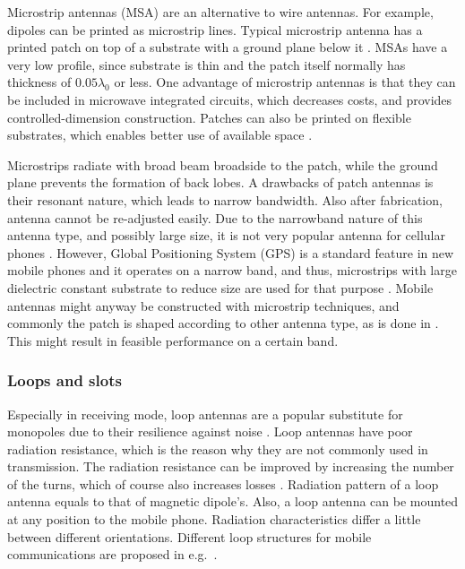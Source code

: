 Microstrip antennas (MSA) are an alternative to wire antennas. For example, dipoles can be printed as microstrip lines. Typical microstrip antenna has a printed patch on top of a substrate with a ground plane below it \cite{stutzman}. MSAs have a very low profile, since substrate is thin and the patch itself normally has thickness of $0.05\lambda_0$ or less. One advantage of microstrip antennas is that they can be included in microwave integrated circuits, which decreases costs, and provides controlled-dimension construction. Patches can also be printed on flexible substrates, which enables better use of available space \cite{stutzman}.

Microstrips radiate with broad beam broadside to the patch, while the ground plane prevents the formation of back lobes. A drawbacks of patch antennas is their resonant nature, which leads to narrow bandwidth. Also after fabrication, antenna cannot be re-adjusted easily. Due to the narrowband nature of this antenna type, and possibly large size, it is not very popular antenna for cellular phones \cite{stutzman}. However, Global Positioning System (GPS) is a standard feature in new mobile phones and it operates on a narrow band, and thus, microstrips with large dielectric constant substrate to reduce size are used for that purpose \cite{stutzman}. Mobile antennas might anyway be constructed with microstrip techniques, and commonly the patch is shaped according to other antenna type, as is done in \cite{microstrip_example1,microstrip_example2}. This might result in feasible performance on a certain band.

\subsubsection{Loops and slots}
\label{sec:loop}
Especially in receiving mode, loop antennas are a popular substitute for monopoles due to their resilience against noise \cite{balanis}. Loop antennas have poor radiation resistance, which is the reason why they are not commonly used in transmission. The radiation resistance can be improved by increasing the number of the turns, which of course also increases losses \cite{stutzman}. Radiation pattern of a loop antenna equals to that of magnetic dipole's.  Also, a loop antenna can be mounted at any position to the mobile phone. Radiation characteristics differ a little between different orientations. Different loop structures for mobile communications are proposed in e.g.\ \cite{loop_example1,loop_example2,loop_example3}.

